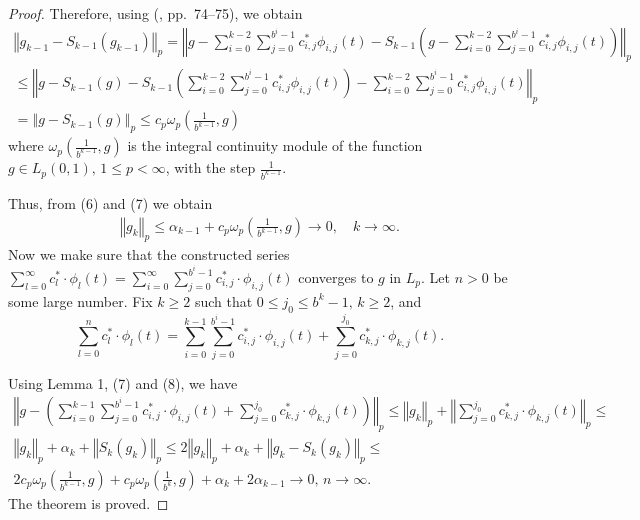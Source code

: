 \documentclass[
11pt,%
tightenlines,%
twoside,%
onecolumn,%
nofloats,%
nobibnotes,%
nofootinbib,%
superscriptaddress,%
noshowpacs,%
centertags]%
{revtex4}
\begin{document}
\begin{proof}
Therefore, using (\cite{ks}, pp.~74--75), we obtain
\begin{eqnarray}
    \left\Vert g_{k-1} - S_{k-1}(g_{k-1}) \right\Vert_p =
    \left\Vert g -
    \sum_{i=0}^{k-2}   \sum_{j=0}^{b^i-1} c^{\ast}_{i,j}  \phi_{i,j}(t)
    -S_{k-1}\left( g -
    \sum_{i=0}^{k-2}   \sum_{j=0}^{b^i-1} c^{\ast}_{i,j}  \phi_{i,j}(t)\right)
    \right\Vert_p
\nonumber   \\
    \le\left\Vert g - S_{k-1}(g)- S_{k-1}\left( \sum_{i=0}^{k-2}
    \sum_{j=0}^{b^i-1} c^{\ast}_{i,j}  \phi_{i,j}(t)\right)
    -\sum_{i=0}^{k-2}   \sum_{j=0}^{b^i-1} c^{\ast}_{i,j}
    \phi_{i,j}(t) \right\Vert_p
\nonumber   \\
    =\left\Vert g - S_{k-1}(g) \right\Vert_p \le c_p \omega_p\left(
    \frac{1}{b^{k-1}}, g\right)
\end{eqnarray}
where $\omega_p\left( \frac{1}{b^{k-1}}, g\right)$ is the integral
continuity module of the function
$g \in L_p(0,1),\, 1\le p<\infty $, with the step  $\frac{1}{b^{k-1}}$.

Thus, from (6) and (7) we obtain
\begin{eqnarray}
    \left\Vert g_k \right\Vert_p \le \alpha_{k-1} +c_p \omega_p\left(
    \frac{1}{b^{k-1}}, g \right) \to 0,\quad k\to \infty.
\end{eqnarray}
Now we make sure that the constructed series
$ \sum_{l=0}^{\infty} c^{\ast}_{l} \cdot \phi_{l}(t)=\sum_{i=0}^{\infty} \sum_{j=0}^{b^{i}-1} c^{\ast}_{i,j} \cdot \phi_{i,j}(t)$
converges to   $ g $  in $ L_p $.
Let $ n> 0 $ be some large number. Fix $k\ge 2$ such that $0\le
j_0 \le b^{k}-1,\, k\ge 2$, and
$$
\sum_{l=0}^{n} c^{\ast}_{l} \cdot \phi_{l}(t)= \sum_{i=0}^{k-1} \sum_{j=0}^{b^{i}-1} c_{i,j}^{\ast} \cdot \phi_{i,j}(t) +
\sum_{j=0}^{j_0} c_{k,j}^{\ast} \cdot \phi_{k,j}(t).
$$

Using Lemma 1, (7) and (8), we have
\begin{multline*}
    \left\Vert  g- \left(  \sum_{i=0}^{k-1} \sum_{j=0}^{b^{i}-1} c_{i,j}^{\ast} \cdot \phi_{i,j}(t) +
    \sum_{j=0}^{j_0} c_{k,j}^{\ast} \cdot \phi_{k,j}(t)   \right)  \right\Vert_p \le
    \left\Vert  g_{k} \right\Vert_p +\left\Vert  \sum_{j=0}^{j_0} c_{k,j}^{\ast} \cdot \phi_{k,j}(t)    \right\Vert_p \le
    \\
    \left\Vert  g_{k} \right\Vert_p + \alpha_k + \left\Vert  S_{k}(g_{k})  \right\Vert_p \le
    2\left\Vert  g_{k} \right\Vert_p + \alpha_k +
    \left\Vert g_{k} - S_{k} (g_{k})
    \right\Vert_p     \le
    \\
    2 c_p \omega_p\left( \frac{1}{b^{k-1}}, g \right)
    +   c_p \omega_p\left( \frac{1}{b^{k}}, g \right)
    +   \alpha_k +2\alpha_{k-1}
    \to 0,\, n\to \infty.
\end{multline*}
The theorem is proved.
\end{proof}
\end{document}
